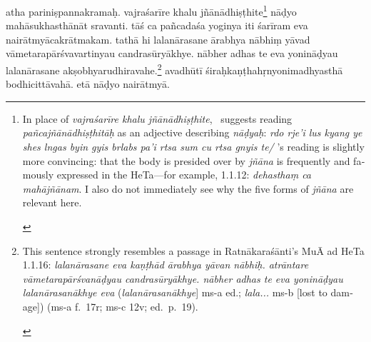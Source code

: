\documentclass[naipra.tex]{subfiles}
\begin{document}
\begin{sanskrit}
\pstart
atha pariniṣpannakramaḥ.
vajraśarīre khalu jñānādhiṣṭhite\footnote{
	\begin{english}%
		In place of \emph{vajraśarīre khalu jñānādhiṣṭhite}, \TIB\ suggests reading \emph{pañcajñānādhiṣṭhitāḥ} as an adjective describing \emph{nāḍyaḥ}: \emph{rdo rje'i lus kyang ye shes lngas byin gyis brlabs pa'i rtsa sum cu rtsa gnyis te/} 
		\MSN 's reading is slightly more convincing: that the body is presided over by \emph{jñāna} is frequently and famously expressed in the HeTa—for example, 1.1.12: \emph{dehasthaṃ ca mahājñānam}.
		I also do not immediately see why the five forms of \emph{jñāna} are relevant here.
	\end{english}
}  nāḍyo mahāsukhasthānāt sravanti.
tāś ca pañcadaśa yoginya iti śarīram eva nairātmyācakrātmakam. 
tathā hi lalanārasane  ārabhya nābhiṃ yāvad vāmetarapārśvavartinyau candrasūryākhye.
nābher adhas te eva yonināḍyau lalanārasane akṣobhyarudhiravahe.\footnote{
	\begin{english}%
		This sentence strongly resembles a passage in Ratnākaraśānti's MuĀ ad HeTa 1.1.16:
		\emph{lalanārasane eva kaṇṭhād ārabhya yāvan nābhiḥ.
		atrāntare vāmetarapārśvanāḍyau candrasūryākhye.
		nābher adhas te eva yonināḍyau lalanārasanākhye eva} (\emph{lalanārasanākhye}] ms-a ed.; \emph{lala...} ms-b [lost to damage]) (ms-a f.\ 17r; ms-c 12v; ed.\ p.\ 19).
	\end{english}
}
avadhūtī śiraḥkaṇṭhahṛnyonimadhyasthā bodhicittāvahā.
etā nāḍyo nairātmyā. 
\pend





\end{sanskrit}
\end{document}
